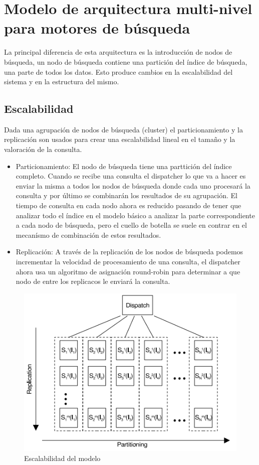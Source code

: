 \documentclass[a4paper, 11pt]{article} %
\begin{document}
		\section{Modelo de arquitectura multi-nivel para motores de búsqueda}
		La principal diferencia de esta arquitectura es la introducción de nodos de búsqueda, un nodo de búsqueda contiene una partición del índice de búsqueda, una parte de todos los datos. Esto produce cambios en la escalabilidad del sistema y en la estructura del mismo.
		\subsection{Escalabilidad}
		Dada una agrupación de nodos de búsqueda (cluster) el particionamiento y la replicación son usados para crear una escalabilidad lineal en el tamaño y la valoración de la consulta.
		\begin{itemize}
			\item Particionamiento: El nodo de búsqueda tiene una parttición del índice completo. Cuando se recibe una consulta el dispatcher lo que va a hacer es enviar la misma a todos los nodos de búsqueda donde cada uno procesará la consulta y por último se combinarán los resultados de su agrupación. El tiempo de consulta en cada nodo ahora es reducido pasando de tener que analizar todo el índice en el modelo básico a analizar la parte correspondiente a cada nodo de búsqueda, pero el cuello de botella se suele en contrar en el mecanísmo de combinación de estos resultados.
			\item Replicación: A través de la replicación de los nodos de búsqueda podemos incrementar la velocidad de procesamiento de una consulta, el dispatcher ahora usa un algoritmo de asignación round-robin para determinar a que nodo de entre los replicacos le enviará la consulta.
		\end{itemize}
		\begin{figure}[H]
				\centering
				\includegraphics[scale=0.75]{./img/multitier.png}
				\caption{Escalabilidad del modelo}
				\label{fig:my_label}
		\end{figure}
\end{document}
